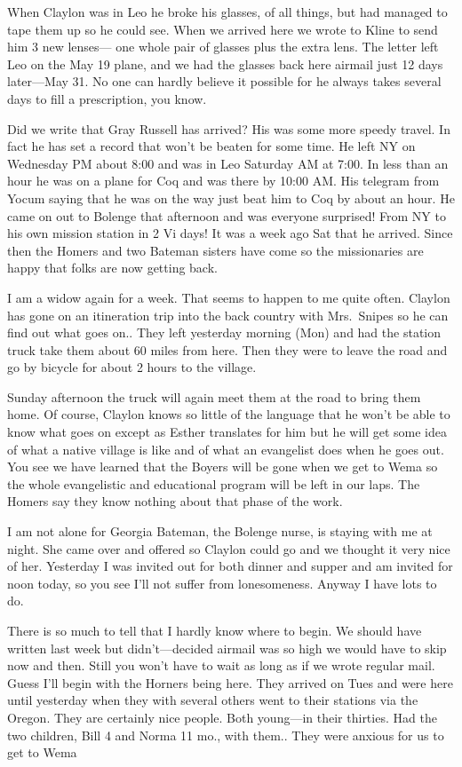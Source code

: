 \documentclass[
]{book}
\begin{document}
When Claylon was in Leo he broke his glasses, of all things, but had managed to tape them up so he could see. When we arrived here we wrote to Kline to send him 3 new lenses--- one whole pair of glasses plus the extra lens. The letter left Leo on the May 19 plane, and we had the glasses back here airmail just 12 days later---May 31. No one can hardly believe it possible for he always takes several days to fill a prescription, you know.

Did we write that Gray Russell has arrived? His was some more speedy travel. In fact he has set a record that won't be beaten for some time. He left NY on Wednesday PM about 8:00 and was in Leo Saturday AM at 7:00. In less than an hour he was on a plane for Coq and was there by 10:00 AM. His telegram from Yocum saying that he was on the way just beat him to Coq by about an hour. He came on out to Bolenge that afternoon and was everyone surprised! From NY to his own mission station in 2 Vi days! It was a week ago Sat that he arrived. Since then the Homers and two Bateman sisters have come so the missionaries are happy that folks are now getting back.

I am a widow again for a week. That seems to happen to me quite often. Claylon has gone on an itineration trip into the back country with Mrs.~Snipes so he can find out what goes on.. They left yesterday morning (Mon) and had the station truck take them about 60 miles from here. Then they were to leave the road and go by bicycle for about 2 hours to the village.

Sunday afternoon the truck will again meet them at the road to bring them home. Of course, Claylon knows so little of the language that he won't be able to know what goes on except as Esther translates for him but he will get some idea of what a native village is like and of what an evangelist does when he goes out. You see we have learned that the Boyers will be gone when we get to Wema so the whole evangelistic and educational program will be left in our laps. The Homers say they know nothing about that phase of the work.

I am not alone for Georgia Bateman, the Bolenge nurse, is staying with me at night. She came over and offered so Claylon could go and we thought it very nice of her. Yesterday I was invited out for both dinner and supper and am invited for noon today, so you see I'll not suffer from lonesomeness. Anyway I have lots to do.

There is so much to tell that I hardly know where to begin. We should have written last week but didn't---decided airmail was so high we would have to skip now and then. Still you won't have to wait as long as if we wrote regular mail. Guess I'll begin with the Horners being here. They arrived on Tues and were here until yesterday when they with several others went to their stations via the Oregon. They are certainly nice people. Both young---in their thirties. Had the two children, Bill 4 and Norma 11 mo., with them.. They were anxious for us to get to Wema
\end{document}
